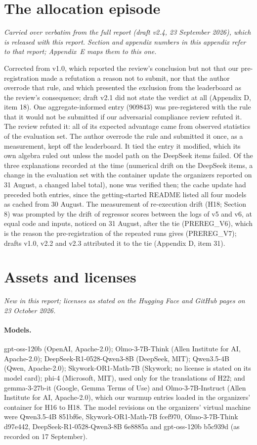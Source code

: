 \section{The allocation episode}\label{app:G}
\emph{Carried over verbatim from the full report (draft v2.4, 23 September 2026), which is released with this report. Section and appendix numbers in this appendix refer to that report; Appendix~E maps them to this one.}

Corrected from v1.0, which reported the review's conclusion but not that our pre-registration made a refutation a reason not to submit, nor that the author overrode that rule, and which presented the exclusion from the leaderboard as the review's consequence; draft v2.1 did not state the verdict at all (Appendix D, item 18). One aggregate-informed entry (909843) was pre-registered with the rule that it would not be submitted if our adversarial compliance review refuted it. The review refuted it: all of its expected advantage came from observed statistics of the evaluation set. The author overrode the rule and submitted it once, as a measurement, kept off the leaderboard. It tied the entry it modified, which its own algebra ruled out unless the model path on the DeepSeek items failed. Of the three explanations recorded at the time (numerical drift on the DeepSeek items, a change in the evaluation set with the container update the organizers reported on 31 August, a changed label total), none was verified then; the cache update had preceded both entries, since the getting-started README listed all four models as cached from 30 August. The measurement of re-execution drift (H18; Section 8) was prompted by the drift of regressor scores between the logs of v5 and v6, at equal code and inputs, noticed on 31 August, after the tie (PREREG\_V6), which is the reason the pre-registration of the repeated runs gives (PREREG\_V7); drafts v1.0, v2.2 and v2.3 attributed it to the tie (Appendix D, item 31).

\section{Assets and licenses}\label{app:H}
\emph{New in this report; licenses as stated on the Hugging Face and GitHub pages on 23 October 2026.}

\paragraph{Models.} gpt-oss-120b (OpenAI, Apache-2.0); Olmo-3-7B-Think (Allen Institute for AI, Apache-2.0); DeepSeek-R1-0528-Qwen3-8B (DeepSeek, MIT); Qwen3.5-4B (Qwen, Apache-2.0); Skywork-OR1-Math-7B (Skywork; no license is stated on its model card); phi-4 (Microsoft, MIT), used only for the translations of H22; and gemma-3-27b-it (Google, Gemma Terms of Use) and Olmo-3-7B-Instruct (Allen Institute for AI, Apache-2.0), which our warmup entries loaded in the organizers' container for H16 to H18. The model revisions on the organizers' virtual machine were Qwen3.5-4B 851bf6e, Skywork-OR1-Math-7B fcef970, Olmo-3-7B-Think d97e442, DeepSeek-R1-0528-Qwen3-8B 6e8885a and gpt-oss-120b b5c939d (as recorded on 17 September).

